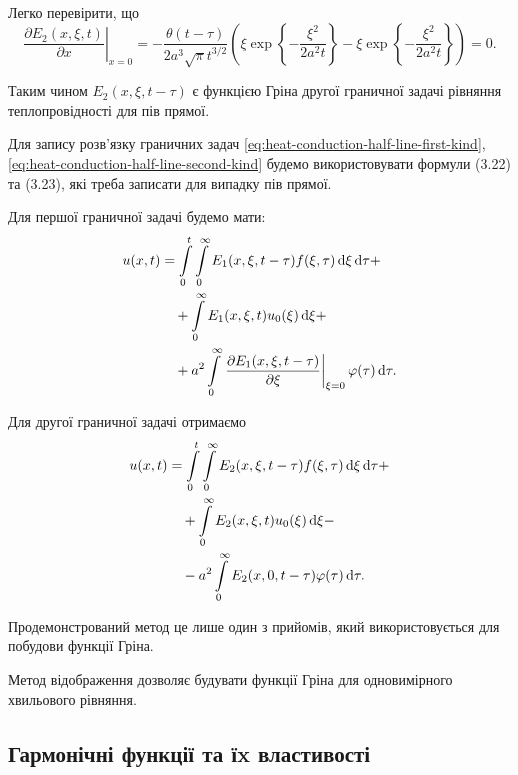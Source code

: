 \begin{solution}
	Легко перевірити, що
	\begin{equation}
		\left. \frac{\partial E_2(x, \xi, t)}{\partial x} \right|_{x = 0} = - \frac{\theta(t - \tau)}{2 a^3 \sqrt{\pi} t^{3/2}} \left( \xi \exp\left\{ -\frac{\xi^2}{2a^2t}\right\} - \xi \exp\left\{ -\frac{\xi^2}{2a^2t}\right\} \right) = 0.
	\end{equation}

	Таким чином $E_2(x, \xi, t - \tau)$ є функцією Гріна другої граничної задачі рівняння теплопровідності для пів прямої. \medskip
\end{solution}

Для запису розв'язку граничних задач \eqref{eq:heat-conduction-half-line-first-kind}, \eqref{eq:heat-conduction-half-line-second-kind} будемо використовувати формули (3.22) та (3.23), які треба записати для випадку пів прямої. \medskip

Для першої граничної задачі будемо мати:
\begin{equation}
	\begin{aligned}
		u(x, t) &= \displaystyle\int\limits_0^t \displaystyle\int\limits_0^\infty E_1(x, \xi, t - \tau) f(\xi, \tau) \mathop{}\!\mathrm{d} \xi \mathop{}\!\mathrm{d} \tau + \\
		& \quad + \displaystyle\int\limits_0^\infty E_1(x, \xi, t) u_0(\xi) \mathop{}\!\mathrm{d} \xi + \\ 
		& \quad + a^2 \displaystyle\int\limits_0^\infty \left. \frac{\partial E_1(x, \xi, t - \tau)}{\partial \xi} \right|_{\xi = 0} \varphi(\tau) \mathop{}\!\mathrm{d} \tau.
	\end{aligned}
\end{equation}

Для другої граничної задачі отримаємо 
\begin{equation}
	\begin{aligned}
		u(x, t) &= \displaystyle\int\limits_0^t \displaystyle\int\limits_0^\infty E_2(x, \xi, t - \tau) f(\xi, \tau) \mathop{}\!\mathrm{d} \xi \mathop{}\!\mathrm{d} \tau + \\
		& \quad + \displaystyle\int\limits_0^\infty E_2(x, \xi, t) u_0(\xi) \mathop{}\!\mathrm{d} \xi - \\ 
		& \quad - a^2 \displaystyle\int\limits_0^\infty E_2(x, 0, t - \tau) \varphi(\tau) \mathop{}\!\mathrm{d} \tau.
	\end{aligned}
\end{equation}

Продемонстрований метод це лише один з прийомів, який використовується для побудови функції Гріна. \medskip

Метод відображення дозволяє будувати функції Гріна для одновимірного хвильового рівняння.

\subsection{Гармонічні функції та їx властивості}

